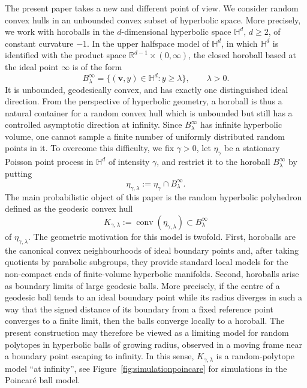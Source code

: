 \documentclass[11pt,a4paper]{article}
\theoremstyle{plain}
\theoremstyle{definition}
\theoremstyle{remark}
\newcommand{\bv}{\boldsymbol{v}}
\def\HH{\mathbb{H}}
\def\RR{\mathbb{R}}
\newcommand{\conv}{\mathop{\mathrm{conv}}\nolimits}
\begin{document}
The present paper takes a new and different point of view. We consider random convex
hulls in an unbounded convex subset of hyperbolic space. More precisely, we work with horoballs in the $d$-dimensional hyperbolic space $\HH^d$, $d\geq 2$, of constant curvature
$-1$. In the upper halfspace model of $\HH^d$, in which $\HH^d$ is identified with the product space $\RR^{d-1}\times(0,\infty)$, the closed horoball based at the ideal
point $\infty$ is of the form
\[
	B_\lambda^\infty=\{(\bv,y)\in\HH^d:y\ge \lambda\},
	\qquad \lambda>0.
\]
It is unbounded, geodesically convex, and has exactly one distinguished ideal direction. From the perspective of hyperbolic geometry, a horoball is thus a natural container for a random convex hull which is unbounded but still has a controlled asymptotic direction at infinity. Since $B_\lambda^\infty$ has infinite hyperbolic volume, one cannot sample a finite number of uniformly distributed random points in it. To overcome this difficulty, we fix $\gamma>0$, let $\eta_\gamma$ be a stationary Poisson point process in $\HH^d$ of intensity $\gamma$, and restrict it to the horoball $B_\lambda^\infty$ by putting
\[
	\eta_{\gamma,\lambda}:=\eta_\gamma\cap B_\lambda^\infty.
\]
The main probabilistic object of this paper is the random hyperbolic polyhedron defined as the geodesic convex hull
\[
	K_{\gamma,\lambda}:=\conv(\eta_{\gamma,\lambda}) \subset B_\lambda^\infty
\]
of $\eta_{\gamma,\lambda}$. The geometric motivation for this model is twofold. First, horoballs are the canonical convex neighbourhoods of ideal boundary points and, after taking
quotients by parabolic subgroups, they provide standard local models for the non-compact ends of finite-volume hyperbolic manifolds. Second, horoballs arise as boundary limits of large geodesic balls. More precisely, if the centre of a geodesic ball tends to an ideal boundary point while its radius diverges in such a way that the signed distance of its boundary from a fixed reference point converges to a finite limit, then the balls
converge locally to a horoball. The present construction may therefore be viewed as a limiting model for random polytopes in hyperbolic balls of growing radius, observed in a moving frame near a boundary point escaping to infinity. In this sense, $K_{\gamma,\lambda}$ is a random-polytope model ``at infinity'', see Figure~\ref{fig:simulationpoincare} for simulations in the Poincar\'e ball model.
\end{document}
